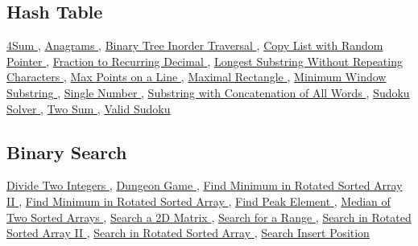 \documentclass{article}
\begin{document}
\begin{CJK*}{UTF8}{gkai}
\subsection*{ Hash Table }
\label{ Hash Table }
\hyperref[ 4Sum ]{ 4Sum },
\hyperref[ Anagrams ]{ Anagrams },
\hyperref[ Binary Tree Inorder Traversal ]{ Binary Tree Inorder Traversal },
\hyperref[ Copy List with Random Pointer ]{ Copy List with Random Pointer },
\hyperref[ Fraction to Recurring Decimal ]{ Fraction to Recurring Decimal },
\hyperref[ Longest Substring Without Repeating Characters ]{ Longest Substring Without Repeating Characters },
\hyperref[ Max Points on a Line ]{ Max Points on a Line },
\hyperref[ Maximal Rectangle ]{ Maximal Rectangle },
\hyperref[ Minimum Window Substring ]{ Minimum Window Substring },
\hyperref[ Single Number ]{ Single Number },
\hyperref[ Substring with Concatenation of All Words ]{ Substring with Concatenation of All Words },
\hyperref[ Sudoku Solver ]{ Sudoku Solver },
\hyperref[ Two Sum ]{ Two Sum },
\hyperref[ Valid Sudoku ]{ Valid Sudoku }

\subsection*{ Binary Search }
\label{ Binary Search }
\hyperref[ Divide Two Integers ]{ Divide Two Integers },
\hyperref[ Dungeon Game ]{ Dungeon Game },
\hyperref[ Find Minimum in Rotated Sorted Array II ]{ Find Minimum in Rotated Sorted Array II },
\hyperref[ Find Minimum in Rotated Sorted Array ]{ Find Minimum in Rotated Sorted Array },
\hyperref[ Find Peak Element ]{ Find Peak Element },
\hyperref[ Median of Two Sorted Arrays ]{ Median of Two Sorted Arrays },
\hyperref[ Search a 2D Matrix ]{ Search a 2D Matrix },
\hyperref[ Search for a Range ]{ Search for a Range },
\hyperref[ Search in Rotated Sorted Array II ]{ Search in Rotated Sorted Array II },
\hyperref[ Search in Rotated Sorted Array ]{ Search in Rotated Sorted Array },
\hyperref[ Search Insert Position ]{ Search Insert Position }


\end{CJK*}
\end{document}
